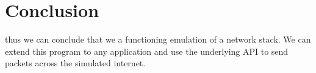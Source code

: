 \section{Conclusion}
thus we can conclude that we a functioning emulation of a network stack. 
We can extend this program to any application and use the underlying API to send packets across the simulated internet.
